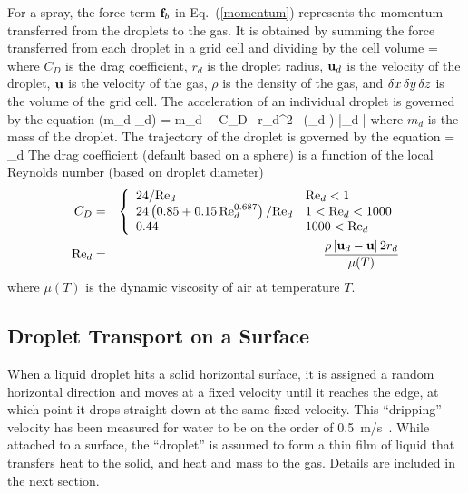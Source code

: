 \documentclass[11pt]{book}
\begin{document}
For a spray, the force term ${\bf f}_b$ in Eq.~(\ref{momentum})
represents the momentum transferred from the droplets to the gas.
It is obtained by summing the force transferred from each droplet
in a grid cell and dividing by the cell volume
 = \ha {}
    {\dx \, \dy \, \dz} \ee
where $C_D$ is the drag coefficient, $r_d$ is the droplet radius,
${\bf u}_d$ is the velocity of the droplet, ${\bf u}$ is the
velocity of the gas, $\rho$ is the density of the gas,
and $\delta x \, \delta y \, \delta z$ is the volume of the grid cell.
The acceleration of an individual droplet is governed by the equation
\be
     (m_d \bu_d) = m_d\, \bg - \ha \rho\,C_D \, \pi  r_d^2 \,
    (\bu_d-\bu) |\bu_d-\bu|
\ee
where $m_d$ is the mass of the droplet.  The trajectory of the droplet is governed by the equation
\be
     = \bu_d
\ee
The drag coefficient (default based on a sphere) is a function of the local Reynolds number (based on droplet diameter)
\begin{eqnarray}
 C_D &=& \left\{ \begin{array}{ll}
     24/\hbox{Re}_d                                       & \hbox{Re}_d < 1    \\
     24\left(0.85+0.15 \, \hbox{Re}_d^{0.687} \right)/\hbox{Re}_d  & 1 < \hbox{Re}_d < 1000 \\
     0.44                                           & 1000 < \hbox{Re}_d
     \end{array} \right.  \\
\hbox{Re}_d &=& \frac{\rho \, |{\bf u}_d-{\bf u}| \, 2 r_d}{\mu(T)} \end{eqnarray}
where $\mu(T)$ is the dynamic viscosity of air at temperature $T$.



\subsection{Droplet Transport on a Surface}

When a liquid droplet hits a solid horizontal surface, it is assigned a
random horizontal direction and moves at a fixed velocity until it
reaches the edge, at which point it drops straight down at the same
fixed velocity. This ``dripping'' velocity has been measured for water to be on
the order of 0.5~m/s~\cite{Hamins:1,Hamins:IAFSS2002}. While attached to a surface, the ``droplet'' is assumed to form a thin film of liquid that transfers heat to the solid, and heat and mass to
the gas. Details are included in the next section.
\end{document}
